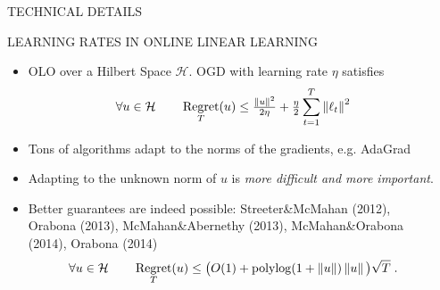 \documentclass[final,t,serif,mathserif]{beamer}
\renewcommand{\H}{\mathcal{H}}  %
\DeclareMathOperator{\Regret}{Regret}
\DeclareMathOperator{\polylog}{polylog}
\def\spaziooo{\vspace{-0.cm}}
\begin{document}
\begin{frame}{}
\begin{columns}[t]
\begin{column}{.33\linewidth}
    
    \end{column}
    
    
    
    \begin{column}{.33\linewidth}

    
    \begin{block}{TECHNICAL DETAILS}
    \begin{minipage}{.98\linewidth}
    \begin{block}{LEARNING RATES IN ONLINE LINEAR LEARNING}
    \spaziooo
    \begin{itemize}
      \item OLO over a Hilbert Space $\H$. OGD with learning rate
	$\eta$ satisfies
	\[
	\forall u \in \H \qquad \Regret_T(u) \le \tfrac{\norm{u}^2}{2\eta} + \tfrac{\eta}{2} \sum_{t=1}^T \norm{\ell_t}^2
	\]
      \item Tons of algorithms adapt to the norms of the gradients, e.g. AdaGrad
      \item Adapting to the unknown norm of $u$ is \emph{more difficult and more important}.
      \item Better guarantees are indeed possible: Streeter\&McMahan (2012), Orabona (2013), McMahan\&Abernethy (2013), McMahan\&Orabona (2014), Orabona (2014) 
	\[
	\forall u \in \H \qquad \Regret_T(u) \le \big(O(1)+\polylog(1 + \norm{u})\norm{u} \big) \sqrt{T} \; .
	\]
    \end{itemize}
    \spaziooo
    \end{block}
    


\end{minipage}
\end{block}
\end{column}
\end{columns}
\end{frame}
\end{document}

